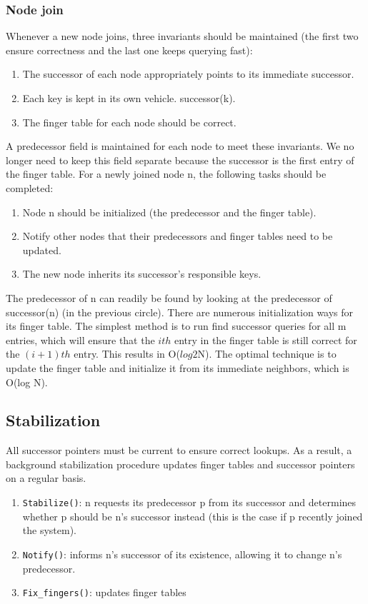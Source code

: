 \documentclass[acmlarge]{acmart}
\begin{document}
\subsubsection{Node join}
Whenever a new node joins, three invariants should be maintained (the first two ensure correctness and the last one keeps querying fast):
\begin{enumerate}
  \item The successor of each node appropriately points to its immediate successor.
  \item Each key is kept in its own vehicle. successor(k).
  \item The finger table for each node should be correct.
\end{enumerate}
A predecessor field is maintained for each node to meet these invariants. We no longer need to keep this field separate because the successor is the first entry of the finger table. For a newly joined node n, the following tasks should be completed:
\begin{enumerate}
  \item Node n should be initialized (the predecessor and the finger table).
  \item Notify other nodes that their predecessors and finger tables need to be updated.
  \item The new node inherits its successor's responsible keys.
\end{enumerate}
The predecessor of n can readily be found by looking at the predecessor of successor(n) (in the previous circle). There are numerous initialization ways for its finger table. The simplest method is to run find successor queries for all m entries, which will ensure that the $ith$ entry in the finger table is still correct for the $(i+1)th$ entry. This results in O($log2$N). The optimal technique is to update the finger table and initialize it from its immediate neighbors, which is O(log N).

\subsection{Stabilization}

All successor pointers \cite{gummadi2003impact} must be current to ensure correct lookups. As a result, a background stabilization procedure updates finger tables and successor pointers on a regular basis.
\begin{enumerate}
  \item \texttt{Stabilize()}: n requests its predecessor p from its successor and determines whether p should be n's successor instead (this is the case if p recently joined the system).
  \item \texttt{Notify()}: informs n's successor of its existence, allowing it to change n's predecessor.
  \item \texttt{Fix\_fingers()}: updates finger tables
\end{enumerate}
\end{document}
